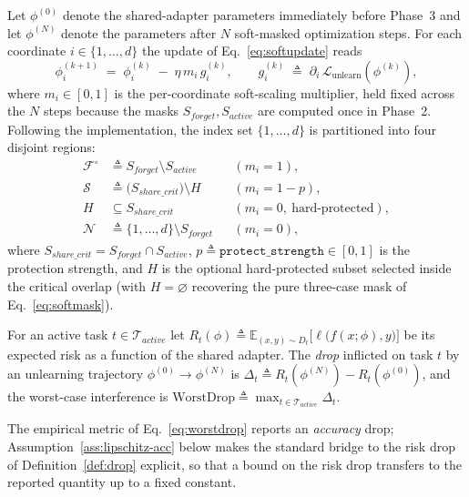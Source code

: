 Let $\phi^{(0)}$ denote the shared-adapter parameters immediately
before Phase~3 and let $\phi^{(N)}$ denote the parameters after $N$
soft-masked optimization steps. For each coordinate
$i\in\{1,\dots,d\}$ the update of Eq.~\eqref{eq:softupdate} reads
\begin{equation}
\phi^{(k+1)}_{i} \;=\; \phi^{(k)}_{i}
       \;-\; \eta\, m_{i}\, g^{(k)}_{i},
\qquad
g^{(k)}_{i}\;\triangleq\;\partial_{i}\,\mathcal{L}_{\text{unlearn}}\!\left(\phi^{(k)}\right),
\label{eq:coord-update}
\end{equation}
where $m_{i}\in[0,1]$ is the per-coordinate soft-scaling multiplier,
held fixed across the $N$ steps because the masks
$S_{forget},S_{active}$ are computed once in Phase~2. Following the
implementation, the index set $\{1,\dots,d\}$ is partitioned into four
disjoint regions:
\begin{equation}
\label{eq:partition}
\begin{aligned}
\mathcal{F}^{\!\circ} &\triangleq S_{forget}\setminus S_{active}
   && (m_i = 1), \\
\mathcal{S} &\triangleq \big(S_{share\_crit}\big)\setminus H
   && (m_i = 1-p), \\
H &\subseteq S_{share\_crit}
   && (m_i = 0,\ \text{hard-protected}), \\
\mathcal{N} &\triangleq \{1,\dots,d\}\setminus S_{forget}
   && (m_i = 0),
\end{aligned}
\end{equation}
where $S_{share\_crit}=S_{forget}\cap S_{active}$,
$p\triangleq\texttt{protect\_strength}\in[0,1]$ is the protection
strength, and $H$ is the optional hard-protected subset selected
inside the critical overlap (with $H=\varnothing$ recovering the pure
three-case mask of Eq.~\eqref{eq:softmask}).

\begin{definition}
\label{def:drop}
For an active task $t\in\mathcal{T}_{active}$ let
$R_{t}(\phi)\triangleq\mathbb{E}_{(x,y)\sim D_{t}}\big[\ell\big(f(x;\phi),y\big)\big]$
be its expected risk as a function of the shared adapter. The
\emph{drop} inflicted on task $t$ by an unlearning trajectory
$\phi^{(0)}\!\to\!\phi^{(N)}$ is
$\Delta_{t}\triangleq R_{t}(\phi^{(N)})-R_{t}(\phi^{(0)})$, and the
worst-case interference is
$\mathrm{WorstDrop}\triangleq\max_{t\in\mathcal{T}_{active}}\Delta_{t}$.
\end{definition}

\noindent
The empirical metric of Eq.~\eqref{eq:worstdrop} reports an
\emph{accuracy} drop; Assumption~\ref{ass:lipschitz-acc} below makes
the standard bridge to the risk drop of Definition~\ref{def:drop}
explicit, so that a bound on the risk drop transfers to the reported
quantity up to a fixed constant.

